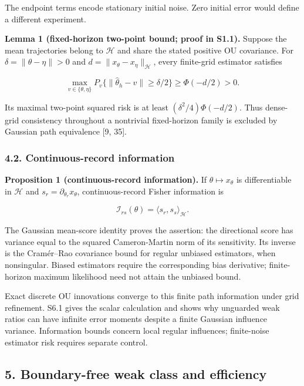 \documentclass[
  american,
  11pt,
]{article}
\begin{document}
The endpoint terms encode stationary initial noise. Zero initial error
would define a different experiment.

\textbf{Lemma 1 (fixed-horizon two-point bound; proof in S1.1).} Suppose
the mean trajectories belong to \(\mathcal H\) and share the stated
positive OU covariance. For \(\delta=\|\theta-\eta\|>0\) and
\(d=\|x_\theta-x_\eta\|_{\mathcal H}\), every finite-grid estimator
satisfies

\[
\max_{v\in\{\theta,\eta\}}P_v\{\|\widehat\theta_h-v\|\geq\delta/2\}
\geq\Phi(-d/2)>0.
\]

Its maximal two-point squared risk is at least
\((\delta^2/4)\Phi(-d/2)\). Thus dense-grid consistency throughout a
nontrivial fixed-horizon family is excluded by Gaussian path equivalence
{[}9, 35{]}.

\subsubsection{4.2. Continuous-record
information}\label{continuous-record-information}

\textbf{Proposition 1 (continuous-record information).} If
\(\theta\mapsto x_\theta\) is differentiable in \(\mathcal H\) and
\(s_r=\partial_{\theta_r}x_\theta\), continuous-record Fisher
information is

\[
\mathcal I_{rs}(\theta)=\langle s_r,s_s\rangle_{\mathcal H}.
\]

The Gaussian mean-score identity proves the assertion: the directional
score has variance equal to the squared Cameron-Martin norm of its
sensitivity. Its inverse is the Cramér--Rao covariance bound for regular
unbiased estimators, when nonsingular. Biased estimators require the
corresponding bias derivative; finite-horizon maximum likelihood need
not attain the unbiased bound.

Exact discrete OU innovations converge to this finite path information
under grid refinement. S6.1 gives the scalar calculation and shows why
unguarded weak ratios can have infinite error moments despite a finite
Gaussian influence variance. Information bounds concern local regular
influences; finite-noise estimator risk requires separate control.

\subsection{5. Boundary-free weak class and
efficiency}\label{boundary-free-weak-class-and-efficiency}
\end{document}
